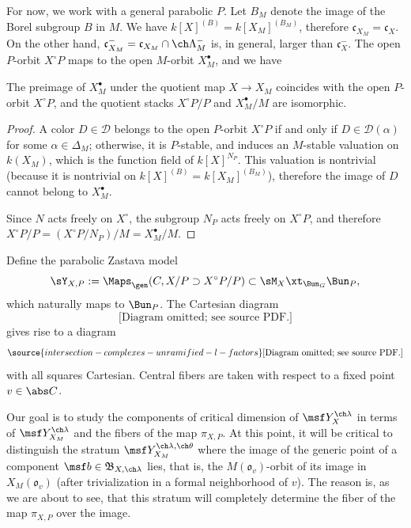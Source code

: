 For now, we work with a general parabolic $P$. Let $B_M$ denote the image of the Borel subgroup $B$ in $M$.
We have $k[X]^{(B)} = k[X_M]^{(B_M)}$, therefore $\mathfrak c_{X_M} = \mathfrak c_X$. On the other hand, $\mathfrak c_{X_M}^- =\mathfrak c_{X_M} \cap \ch\Lambda_M^-$ is, in general, larger than $\mathfrak c_X^-$. The open $P$-orbit $X^\circ P$ maps to the open $M$-orbit $X_M^\bullet$, and we have
\begin{lem}
\notready
 \label{lem:openPorbit}
The preimage of $X_M^\bullet$ under the quotient map $X\to X_M$ coincides with the open $P$-orbit $X^\circ P$, and the quotient stacks $X^\circ P/P$ and $X_M^\bullet/M$ are isomorphic.
\end{lem}

\begin{proof}
A color $D\in \mathcal D$ belongs to the open $P$-orbit $X^\circ P$ if and only if $D\in \mathcal D(\alpha)$ for some $\alpha \in \Delta_M$; otherwise, it is $P$-stable, and induces an $M$-stable valuation on $k(X_M)$, which is the function field of $k[X]^{N_P}$. This valuation is nontrivial (because it is nontrivial on $k[X]^{(B)} = k[X_M]^{(B_M)}$), therefore the image of $D$ cannot belong to $X_M^\bullet$.

Since $N$ acts freely on $X^\circ$, the subgroup $N_P$ acts freely on $X^\circ P$, and therefore $X^\circ P/P = (X^\circ P/N_P)/M = X_M^\bullet/M$.
\end{proof}

Define the parabolic Zastava model
\[ \sY_{X,P} := \Maps_\gen( C, X / P \supset X^\circ P / P ) \subset \sM_X \xt_{\Bun_G} \Bun_P, \]
which naturally maps to $\Bun_P$.
The Cartesian diagram
\[\text{[Diagram omitted; see source PDF.]}\]
gives rise to a diagram
\begin{equation} \label{e:YXPM1}
\source{intersection-complexes-unramified-l-factors}
\text{[Diagram omitted; see source PDF.]}
\end{equation}
with all squares Cartesian.
Central fibers are taken with respect to
a fixed point $v \in \abs C$.

Our goal is to study the components of critical dimension of $\msf Y^{\ch\lambda}_X$ in terms of $\msf Y^{\ch\lambda}_{X_M}$ and the fibers of the map $\pi_{X,P}$. At this point, it will be critical to distinguish the stratum $\msf Y_{X_M}^{\ch\lambda,\ch\theta}$ where the image of the generic point of a component $\msf b \in \mathfrak B_{X,\ch\lambda}$ lies, that is, the $M(\mathfrak o_v)$-orbit of its image in $X_M(\mathfrak o_v)$ (after trivialization in a formal neighborhood of $v$). The reason is, as we are about to see, that this stratum will completely determine the fiber of the map $\pi_{X,P}$ over the image.

